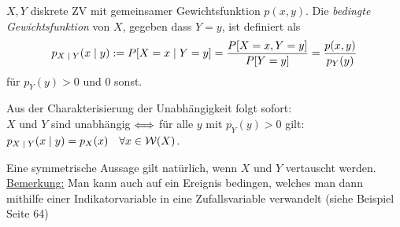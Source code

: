 \begin{definition}
$X,Y$ diskrete ZV mit gemeinsamer Gewichtsfunktion $p(x,y)$. Die \textit{bedingte Gewichtsfunktion} von $X$, gegeben dass $Y=y$, ist definiert als
$$ p_{X \;|\; Y} (x \;|\; y) := P[X=x \;|\; Y=y] = \frac{P[X=x, Y = y]}{P[Y=y]} = \frac{p(x,y)}{p_Y(y)} $$
für $p_Y(y) >0$ und 0 sonst.
\end{definition}

\begin{lemma}
Aus der Charakterisierung der Unabhängigkeit folgt sofort: \\
$X$ und $Y$ sind unabhängig $\Longleftrightarrow$ für alle $y$ mit $p_Y(y)>0$ gilt: $p_{X \;|\; Y} (x \;|\; y) = p_X(x) \quad \forall x\in \mathcal{W}(X)$.
\end{lemma}
Eine symmetrische Aussage gilt natürlich, wenn $X$ und $Y$ vertauscht werden.\\

\underline{Bemerkung:} Man kann auch auf ein Ereignis bedingen, welches man dann mithilfe einer Indikatorvariable in eine Zufallsvariable verwandelt (siehe Beispiel Seite 64)

